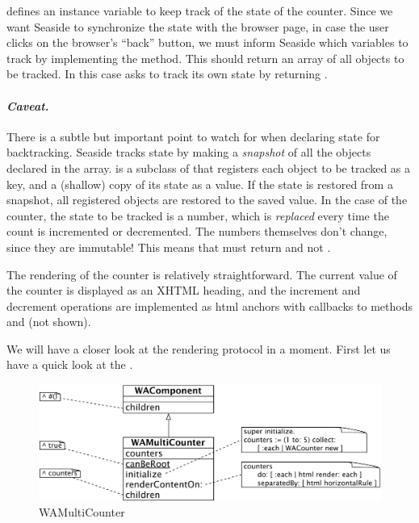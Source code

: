 \documentclass[a4paper,10pt,twoside]{book}
\begin{document}
 defines an instance variable  to keep track of the state of the counter.
Since we want Seaside to synchronize the state with the browser page, \ie in case the user clicks on the browser's ``back'' button, we must inform Seaside which variables to track by implementing the  method.
This should return an array of all objects to be tracked.
In this case  asks to track its own state by returning .

\paragraph{\emph{Caveat.}}
There is a subtle but important point to watch for when declaring state for backtracking.
Seaside tracks state by making a \emph{snapshot} of all the objects declared in the  array.
 is a subclass of  that registers each object to be tracked as a key, and a (shallow) copy of its state as a value.
If the state is restored from a snapshot, all registered objects are restored to the saved value.
In the case of the counter, the state to be tracked is a number, which is \emph{replaced} every time the count is incremented or decremented.
The numbers themselves don't change, since they are immutable!
This means that  must return  and not .

The rendering of the counter is relatively straightforward.
The current value of the counter is displayed as an XHTML heading, and the increment and decrement operations are implemented as html anchors with callbacks to methods  and  (not shown).

We will have a closer look at the rendering protocol in a moment.
First let us have a quick look at the .

\begin{figure}[ht]
\begin{center}
\includegraphics[width=\textwidth]{WAMultiCounter}
\caption{WAMultiCounter}
\label{fig:WAMultiCounter}
\end{center}
\end{figure}
\end{document}
